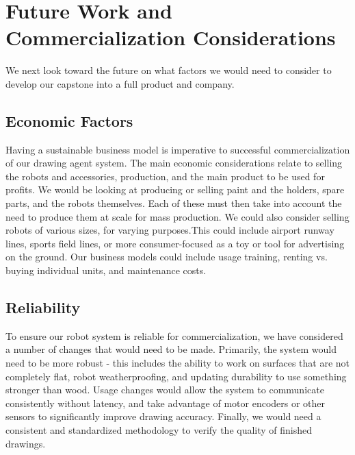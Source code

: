 \section{Future Work and Commercialization Considerations}
\label{sec:future_work}
We next look toward the future on what factors we would need to consider to develop our capstone into a full product and company. 

\subsection{Economic Factors}
Having a sustainable business model is imperative to successful commercialization of our drawing agent system. The main economic considerations relate to selling the robots and accessories, production, and the main product to be used for profits. We would be looking at producing or selling paint and the holders, spare parts, and the robots themselves. Each of these must then take into account the need to produce them at scale for mass production. We could also consider selling robots of various sizes, for varying purposes.This could include airport runway lines, sports field lines, or more consumer-focused as a toy or tool for advertising on the ground. Our business models could include usage training, renting vs. buying individual units, and maintenance costs.

\subsection{Reliability}
To ensure our robot system is reliable for commercialization, we have considered a number of changes that would need to be made. Primarily, the system would need to be more robust - this includes the ability to work on surfaces that are not completely flat, robot weatherproofing, and updating durability to use something stronger than wood. Usage changes would allow the system to communicate consistently without latency, and take advantage of motor encoders or other sensors to significantly improve drawing accuracy. Finally, we would need a consistent and standardized methodology to verify the quality of finished drawings.

